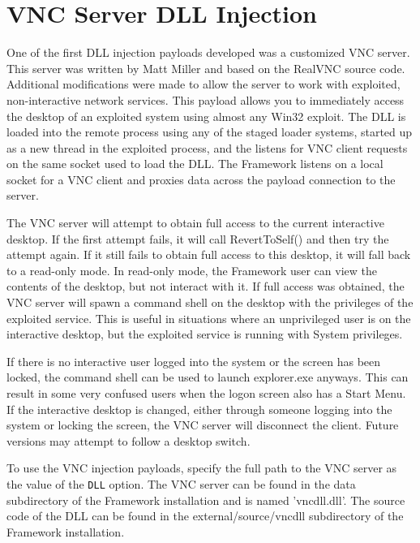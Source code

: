 \documentclass{report}
\begin{document}
\section{VNC Server DLL Injection}
\par
One of the first DLL injection payloads developed was a customized VNC server.
This server was written by Matt Miller and based on the RealVNC source code.
Additional modifications were made to allow the server to work with exploited,
non-interactive network services. This payload allows you to immediately access
the desktop of an exploited system using almost any Win32 exploit. The DLL is
loaded into the remote process using any of the staged loader systems, started
up as a new thread in the exploited process, and the listens for VNC client
requests on the same socket used to load the DLL. The Framework listens
on a local socket for a VNC client and proxies data across the payload
connection to the server.  

\par
The VNC server will attempt to obtain full access to the current interactive
desktop. If the first attempt fails, it will call RevertToSelf() and then try
the attempt again. If it still fails to obtain full access to this desktop, it
will fall back to a read-only mode. In read-only mode, the Framework user can
view the contents of the desktop, but not interact with it. If full access was
obtained, the VNC server will spawn a command shell on the desktop with the
privileges of the exploited service. This is useful in situations where an
unprivileged user is on the interactive desktop, but the exploited service is
running with System privileges.  

\par
If there is no interactive user logged into the system or the screen has been
locked, the command shell can be used to launch explorer.exe anyways. This can
result in some very confused users when the logon screen also has a Start Menu.
If the interactive desktop is changed, either through someone logging into the
system or locking the screen, the VNC server will disconnect the client. Future
versions may attempt to follow a desktop switch. 

\par
To use the VNC injection payloads, specify the full path to the VNC server as
the value of the \texttt{DLL} option. The VNC server can be found in the data
subdirectory of the Framework installation and is named 'vncdll.dll'. The source
code of the DLL can be found in the external/source/vncdll
subdirectory of the Framework installation. 
\end{document}
